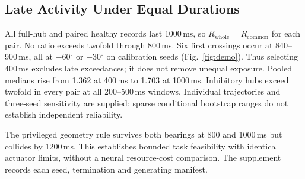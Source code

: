 \subsection{Late Activity Under Equal Durations}
All full-hub and paired healthy records last 1000\,ms, so $R_{\mathrm{whole}}=R_{\mathrm{common}}$ for each pair. No ratio exceeds twofold through 800\,ms. Six first crossings occur at 840--900\,ms, all at $-60^\circ$ or $-30^\circ$ on calibration seeds (Fig.~\ref{fig:demo}). Thus selecting 400\,ms excludes late exceedances; it does not remove unequal exposure. Pooled medians rise from 1.362 at 400\,ms to 1.703 at 1000\,ms. Inhibitory hubs exceed twofold in every pair at all 200--500\,ms windows. Individual trajectories and three-seed sensitivity are supplied; sparse conditional bootstrap ranges do not establish independent reliability.

The privileged geometry rule survives both bearings at 800 and 1000\,ms but collides by 1200\,ms. This establishes bounded task feasibility with identical actuator limits, without a neural resource-cost comparison. The supplement records each seed, termination and generating manifest.
